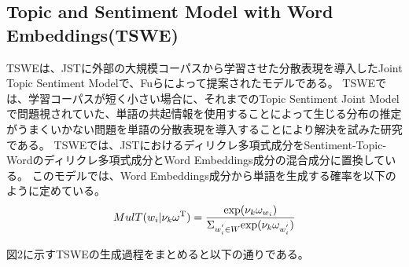 \documentclass[uplatex]{jsarticle}
\begin{document}
\subsection{Topic and Sentiment Model with Word Embeddings(TSWE)}
TSWEは、JSTに外部の大規模コーパスから学習させた分散表現を導入したJoint Topic Sentiment Modelで、Fuら\cite{TSWE}によって提案されたモデルである。
TSWEでは、学習コーパスが短く小さい場合に、それまでのTopic Sentiment Joint Modelで問題視されていた、単語の共起情報を使用することによって生じる分布の推定がうまくいかない問題を単語の分散表現を導入することにより解決を試みた研究である。
TSWEでは、JSTにおけるディリクレ多項式成分をSentiment-Topic-Wordのディリクレ多項式成分とWord Embeddings成分の混合成分に置換している。
このモデルでは、Word Embeddings成分から単語を生成する確率を以下のように定めている。
\begin{equation}
    MulT(w_{i}|\nu_{k}\omega^{\mathrm{T}}) = \frac{{\rm exp}(\nu_{k}\omega_{w_{i}})}{\Sigma_{w_{i}^{'}\in{W}}{\rm exp}(\nu_{k}\omega_{w_{i}^{'}})}
\end{equation}

図2に示すTSWEの生成過程をまとめると以下の通りである。
\end{document}
